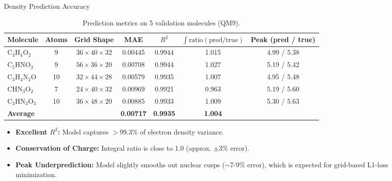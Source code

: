 \documentclass[aspectratio=169]{beamer}
\begin{document}
\begin{frame}{Density Prediction Accuracy}
  \begin{table}[h]
    \centering
    \tiny
    \caption{Prediction metrics on 5 validation molecules (QM9).}
    \begin{tabular*}{\textwidth}{@{\extracolsep{\fill}}lcccccc}
    \toprule
    Molecule & Atoms & Grid Shape & MAE & $R^2$ & $\int \text{ratio} (\text{pred}/\text{true})$ & Peak (pred / true) \\
    \midrule
    C$_3$H$_4$O$_2$ & 9  & $36\times40\times32$ & 0.00445 & 0.9944 & 1.015 & 4.99 / 5.38 \\
    C$_5$HNO$_2$    & 9  & $56\times36\times20$ & 0.00708 & 0.9944 & 1.027 & 5.19 / 5.42 \\
    C$_3$H$_4$N$_2$O & 10 & $32\times44\times28$ & 0.00579 & 0.9935 & 1.007 & 4.95 / 5.48 \\
    CHN$_3$O$_2$    & 7  & $24\times40\times32$ & 0.00969 & 0.9921 & 0.963 & 5.19 / 5.60 \\
    C$_3$HN$_3$O$_3$ & 10 & $36\times48\times20$ & 0.00885 & 0.9933 & 1.009 & 5.30 / 5.63 \\
    \midrule
    \textbf{Average} & & & \textbf{0.00717} & \textbf{0.9935} & \textbf{1.004} & \\
    \bottomrule
    \end{tabular*}
  \end{table}
  
  \begin{itemize}
      \item \textbf{Excellent $R^2$:} Model captures $>99.3\%$ of electron density variance.
      \item \textbf{Conservation of Charge:} Integral ratio is close to 1.0 (approx. $\pm3\%$ error).
      \item \textbf{Peak Underprediction:} Model slightly smooths out nuclear cusps ($\sim$7-9\% error), which is expected for grid-based L1-loss minimization.
  \end{itemize}
\end{frame}
\end{document}
